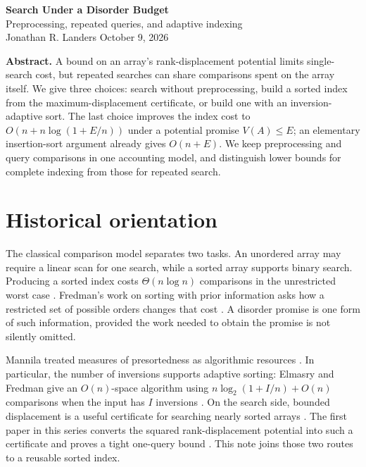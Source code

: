 \documentclass[10pt,letterpaper]{article}
\begin{document}
\begin{center}
{\Large\bfseries Search Under a Disorder Budget}\\[2pt]
{\small Preprocessing, repeated queries, and adaptive indexing}\\[5pt]
Jonathan R. Landers \qquad October 9, 2026
\end{center}

\textbf{Abstract.} A bound on an array's rank-displacement potential limits
single-search cost, but repeated searches can share comparisons spent on the
array itself. We give three choices: search without preprocessing, build a
sorted index from the maximum-displacement certificate, or build one with an
inversion-adaptive sort. The last choice improves the index cost to
$O(n+n\log(1+E/n))$ under a potential promise $V(A)\le E$; an elementary
insertion-sort argument already gives $O(n+E)$. We keep preprocessing and
query comparisons in one accounting model, and distinguish lower bounds for
complete indexing from those for repeated search.

\section{Historical orientation}
The classical comparison model separates two tasks. An unordered array may
require a linear scan for one search, while a sorted array supports binary
search. Producing a sorted index costs $\Theta(n\log n)$ comparisons in the
unrestricted worst case \cite{knuth}. Fredman's work on sorting with prior
information asks how a restricted set of possible orders changes that cost
\cite{fredman}. A disorder promise is one form of such information, provided
the work needed to obtain the promise is not silently omitted.

Mannila treated measures of presortedness as algorithmic resources
\cite{mannila}. In particular, the number of inversions supports adaptive
sorting: Elmasry and Fredman give an $O(n)$-space algorithm using
$n\log_2(1+I/n)+O(n)$ comparisons when the input has $I$ inversions
\cite{elmasryfredman}. On the search side, bounded displacement is a useful
certificate for searching nearly sorted arrays \cite{disser}. The first
paper in this series converts the squared rank-displacement potential into
such a certificate and proves a tight one-query bound \cite{first}.
This note joins those two routes to a reusable sorted index.
\end{document}
